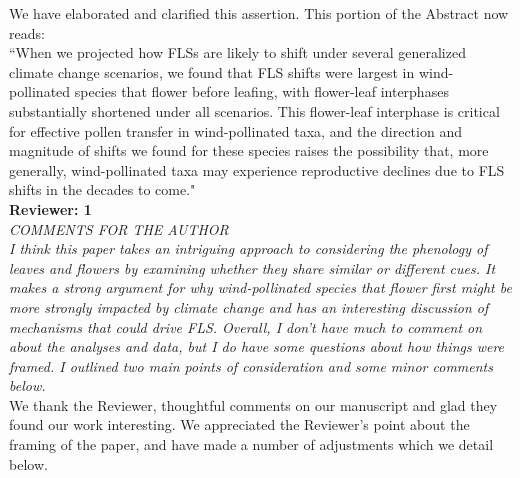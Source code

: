 \documentclass[11pt]{article}
\begin{document}
\noindent We have elaborated and clarified this assertion. This portion of the Abstract now reads:\\
 
 ``When we projected how FLSs are likely to shift under several generalized climate change scenarios, we found that FLS shifts were largest in wind-pollinated species that flower before leafing, with flower-leaf interphases substantially shortened under all scenarios. This flower-leaf interphase is critical for effective pollen transfer in wind-pollinated taxa, and the direction and magnitude of shifts we found for these species raises the possibility that, more generally, wind-pollinated taxa may experience reproductive declines due to FLS shifts in the decades to come."\\

\textbf{Reviewer: 1}\\

\emph{COMMENTS FOR THE AUTHOR\\
I think this paper takes an intriguing approach to considering the phenology of leaves and flowers by examining whether they share similar or different cues. It makes a strong argument for why wind-pollinated species that flower first might be more strongly impacted by climate change and has an interesting discussion of mechanisms that could drive FLS. Overall, I don’t have much to comment on about the analyses and data, but I do have some questions about how things were framed. I outlined two main points of consideration and some minor comments below.}\\

We thank the Reviewer, thoughtful comments on our manuscript and glad they found our work interesting. We appreciated the Reviewer's point about the framing of the paper, and have made a number of adjustments which we detail below. \\
\end{document}
